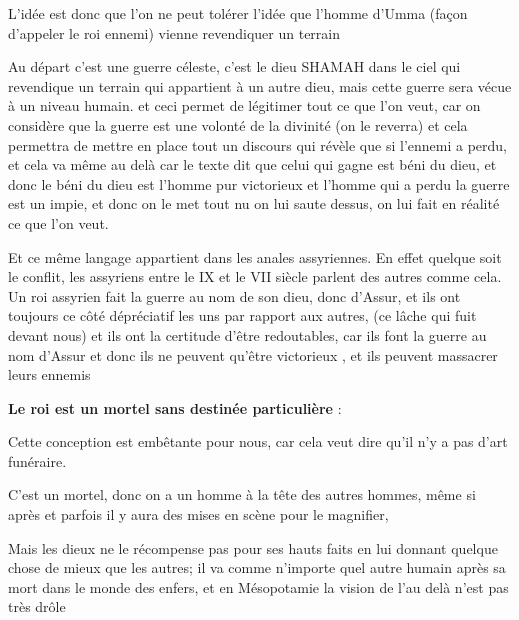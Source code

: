 \documentclass[a4paper]{article}
\begin{document}
\bigskip

{
L'idée est donc que l'on ne peut tolérer l'idée que l'homme d'Umma
(façon d'appeler le roi ennemi) vienne revendiquer un terrain }

{
Au départ c'est une guerre céleste, c'est le dieu SHAMAH dans le ciel
qui revendique un terrain qui appartient à un autre dieu, mais cette
guerre sera vécue à un niveau humain. et ceci permet de légitimer tout
ce que l'on veut, car on considère que la guerre est une volonté de la
divinité (on le reverra) et cela permettra de mettre en place tout un
discours qui révèle que si l'ennemi a perdu, et cela va même au delà
car le texte dit que celui qui gagne est béni du dieu, et donc le béni
du dieu est l'homme pur victorieux et l'homme qui a perdu la guerre est
un impie, et donc on le met tout nu on lui saute dessus, on lui fait en
réalité ce que l'on veut. }

{
Et ce même langage appartient dans les anales assyriennes. En effet
quelque soit le conflit, les assyriens entre le IX et le VII siècle
parlent des autres comme cela. Un roi assyrien fait la guerre au nom de
son dieu, donc d'Assur, et ils ont toujours ce côté dépréciatif les uns
par rapport aux autres, (ce lâche qui fuit devant nous) et ils ont la
certitude d'être redoutables, car ils font la guerre au nom d'Assur et
donc ils ne peuvent qu'être victorieux , et ils peuvent massacrer leurs
ennemis}


\bigskip


\bigskip


\bigskip


\bigskip


\bigskip

{
\textbf{Le roi est un mortel sans destinée particulière} : }


\bigskip

{
Cette conception est embêtante pour nous, car cela veut dire qu'il n'y a
pas d'art funéraire.}

{
C'est un mortel, donc on a un homme à la tête des autres hommes, même si
après et parfois il y aura des mises en scène pour le magnifier, \ }

{
Mais les dieux ne le récompense pas pour ses hauts faits en lui donnant
quelque chose de mieux que les autres; il va comme n'importe quel autre
humain après sa mort dans le monde des enfers, et en Mésopotamie la
vision de l'au delà n'est pas très drôle}
\end{document}
